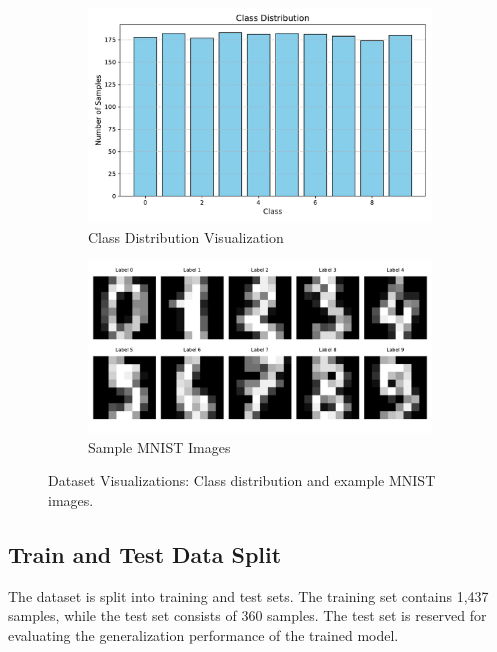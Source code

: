 \documentclass{article}
\begin{document}
\begin{figure}[h]
    \centering
    \begin{subfigure}[b]{0.45\textwidth}
        \includegraphics[width=\textwidth]{images/class_distribution.pdf}
        \caption{Class Distribution Visualization}
        \label{fig:class_distribution}
    \end{subfigure}
    \hfill
    \begin{subfigure}[b]{0.45\textwidth}
        \includegraphics[width=\textwidth]{images/MNIST_samples.pdf}
        \caption{Sample MNIST Images}
        \label{fig:mnist_samples}
    \end{subfigure}
    \caption{Dataset Visualizations: Class distribution and example MNIST images.}
    \label{fig:dataset_visualizations}
\end{figure}

\subsection{Train and Test Data Split}
The dataset is split into training and test sets. The training set contains 1,437 samples, while the test set consists of 360 samples. The test set is reserved for evaluating the generalization performance of the trained model.
\end{document}
